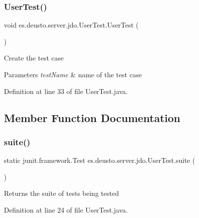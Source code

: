 \subsubsection{\texorpdfstring{User\+Test()}{UserTest()}}
{\footnotesize\ttfamily void es.\+deusto.\+server.\+jdo.\+User\+Test.\+User\+Test (\begin{DoxyParamCaption}{ }\end{DoxyParamCaption})}

Create the test case


\begin{DoxyParams}{Parameters}
{\em test\+Name} & name of the test case \\
\hline
\end{DoxyParams}


Definition at line 33 of file User\+Test.\+java.



\subsection{Member Function Documentation}
\mbox{\label{classes_1_1deusto_1_1server_1_1jdo_1_1_user_test_af4c617a2b9b0593aaaf7d21373190401}} 
\subsubsection{\texorpdfstring{suite()}{suite()}}
{\footnotesize\ttfamily static junit.\+framework.\+Test es.\+deusto.\+server.\+jdo.\+User\+Test.\+suite (\begin{DoxyParamCaption}{ }\end{DoxyParamCaption})\hspace{0.3cm}{\ttfamily [static]}}

\begin{DoxyReturn}{Returns}
the suite of tests being tested 
\end{DoxyReturn}


Definition at line 24 of file User\+Test.\+java.

\mbox{\label{classes_1_1deusto_1_1server_1_1jdo_1_1_user_test_aec9f7ccc079890364b8270d8645e6957}} 
